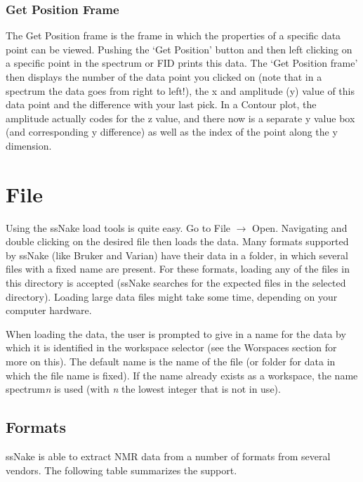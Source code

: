 \documentclass[11pt,a4paper]{article}
\begin{document}
\subsubsection*{Get Position Frame}
The Get Position frame is the frame in which the properties of a specific data point can be viewed. Pushing the `Get Position'  button and then left clicking on a specific point in the spectrum or FID prints this data. The `Get Position frame' then displays the number of the data point you clicked on (note that in a spectrum the data goes from right to left!), the x and amplitude (y) value of this data point and the difference with your last pick. In a Contour plot, the amplitude actually codes for the z value, and there now is a separate y value box (and corresponding y difference) as well as the index of the point along the y dimension.




\section{File}
Using the ssNake load tools is quite easy. Go to File $\rightarrow$ Open. Navigating and double clicking on the desired file then loads the data. Many formats supported by ssNake (like Bruker and Varian) have their data in a folder, in which several files with a fixed name are present. For these formats, loading any of the files in this directory is accepted (ssNake searches for the expected files in the selected directory). Loading large data files might take some time, depending on your computer hardware.

When loading the data, the user is prompted to give in a name for the data by which it is identified in the workspace selector (see the Worspaces section for more on this). The default name is the name of the file (or folder for data in which the file name is fixed). If the name already exists as a workspace, the name spectrum\textit{n} is used (with \textit{n} the lowest integer that is not in use).


\subsection{Formats}
ssNake is able to extract NMR data from a number of formats from several vendors. The following table summarizes the support.
\end{document}
